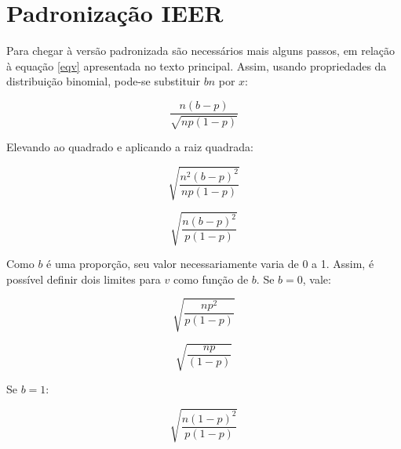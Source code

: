 \documentclass[12pt]{article}
\begin{document}

\clearpage

\appendix


\section{Padronização IEER} \label{standard_ieer}

\par Para chegar à versão padronizada são necessários mais alguns passos, em relação à equação \ref{eqv} apresentada no texto principal. Assim, usando propriedades da distribuição binomial, pode-se substituir $bn$ por $x$:

\begin{equation}
    \frac{n(b-p)}{\sqrt{n p \left(1 - p\right)}}
\end{equation}

\par Elevando ao quadrado e aplicando a raiz quadrada:

\begin{equation}
    \sqrt{\frac{n^{2}\left(b - p\right)^{2}}{n p \left(1 - p\right)}}    
\end{equation}


\begin{equation}
    \sqrt{\frac{n\left(b - p\right)^{2}}{p \left(1 - p\right)}}    
\end{equation}

\par Como $b$ é uma proporção, seu valor necessariamente varia de 0 a 1. Assim, é possível definir dois limites para $v$ como função de $b$. Se $b=0$, vale:

\begin{equation}
    \sqrt{\frac{np^{2}}{p \left(1 - p\right)}}    
\end{equation}

\begin{equation}
    \sqrt{\frac{np}{\left(1 - p\right)}}    
\end{equation}

\par Se $b=1$:

\begin{equation}
    \sqrt{\frac{n\left(1 - p\right)^{2}}{p \left(1 - p\right)}}    
\end{equation}
\end{document}
